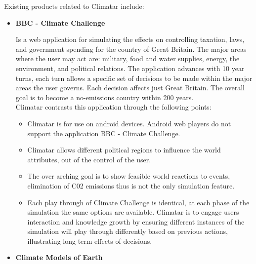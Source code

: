 \documentclass[]{article}
\begin{document}
Existing products related to Climatar include: 
\begin{itemize}
	\item \textbf{BBC - Climate Challenge} 
		
		\cite{BBC}Is a web application for simulating the effects on controlling taxation, laws, and government spending for the country of Great Britain. The major areas where the user may act are: military, food and water supplies, energy, the environment, and political relations. The application advances with 10 year turns, each turn allows a specific set of decisions to be made within the major areas the user governs. Each decision affects just Great Britain. The overall goal is to become a no-emissions country within 200 years. \\
		Climatar contrasts this application through the following points:
		\begin{itemize}
			\item Climatar is for use on android devices. Android web players do not support the application BBC - Climate Challenge.
			\item Climatar allows different political regions to influence the world attributes, out of the control of the user.
			\item The over arching goal is to show feasible world reactions to events, elimination of C02 emissions thus is not the only simulation feature.
			\item Each play through of Climate Challenge is identical, at each phase of the simulation the same options are available. Climatar is to engage users interaction and knowledge growth by ensuring different instances of the simulation will play through differently based on previous actions, illustrating long term effects of decisions.
		\end{itemize}
	
	\item \textbf{Climate Models of Earth}


\end{itemize}
\end{document}
